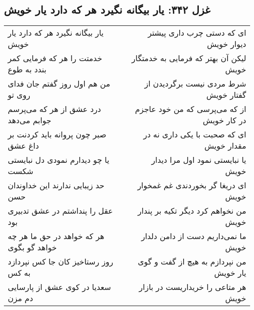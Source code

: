 \begin{center}
\section*{غزل ۳۴۲: یار بیگانه نگیرد هر که دارد یار خویش}
\label{sec:342}
\begin{longtable}{l p{0.5cm} r}
یار بیگانه نگیرد هر که دارد یار خویش
&&
ای که دستی چرب داری پیشتر دیوار خویش
\\
خدمتت را هر که فرمایی کمر بندد به طوع
&&
لیکن آن بهتر که فرمایی به خدمتگار خویش
\\
من هم اول روز گفتم جان فدای روی تو
&&
شرط مردی نیست برگردیدن از گفتار خویش
\\
درد عشق از هر که می‌پرسم جوابم می‌دهد
&&
از که می‌پرسی که من خود عاجزم در کار خویش
\\
صبر چون پروانه باید کردنت بر داغ عشق
&&
ای که صحبت با یکی داری نه در مقدار خویش
\\
یا چو دیدارم نمودی دل نبایستی شکست
&&
یا نبایستی نمود اول مرا دیدار خویش
\\
حد زیبایی ندارند این خداوندان حسن
&&
ای دریغا گر بخوردندی غم غمخوار خویش
\\
عقل را پنداشتم در عشق تدبیری بود
&&
من نخواهم کرد دیگر تکیه بر پندار خویش
\\
هر که خواهد در حق ما هر چه خواهد گو بگوی
&&
ما نمی‌داریم دست از دامن دلدار خویش
\\
روز رستاخیز کان جا کس نپردازد به کس
&&
من نپردازم به هیچ از گفت و گوی یار خویش
\\
سعدیا در کوی عشق از پارسایی دم مزن
&&
هر متاعی را خریداریست در بازار خویش
\\
\end{longtable}
\end{center}
